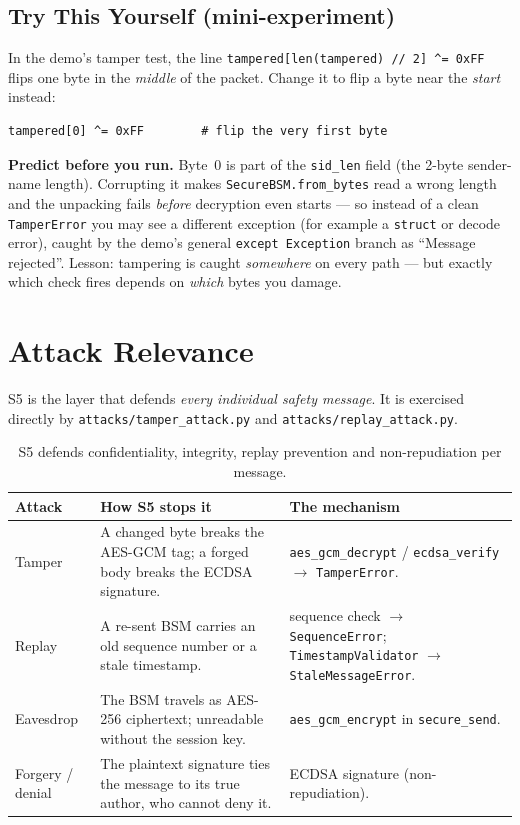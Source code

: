 \documentclass[11pt,a4paper]{article}
\begin{document}
\subsection{Try This Yourself (mini-experiment)}
In the demo's tamper test, the line \texttt{tampered[len(tampered) // 2] \^{}= 0xFF}
flips one byte in the \emph{middle} of the packet. Change it to flip a byte near
the \emph{start} instead:
\begin{lstlisting}[style=term]
tampered[0] ^= 0xFF        # flip the very first byte
\end{lstlisting}
\textbf{Predict before you run.} Byte~0 is part of the \texttt{sid\_len} field
(the 2-byte sender-name length). Corrupting it makes \texttt{SecureBSM.from\_bytes}
read a wrong length and the unpacking fails \emph{before} decryption even starts
--- so instead of a clean \texttt{TamperError} you may see a different exception
(for example a \texttt{struct} or decode error), caught by the demo's general
\texttt{except Exception} branch as ``Message rejected''. Lesson: tampering is
caught \emph{somewhere} on every path --- but exactly which check fires depends
on \emph{which} bytes you damage.

\section{Attack Relevance}

S5 is the layer that defends \emph{every individual safety message}. It is
exercised directly by \texttt{attacks/tamper\_attack.py} and
\texttt{attacks/replay\_attack.py}.

\begin{table}[h]
\centering
\small
\begin{tabular}{@{}p{2.5cm} p{6.1cm} p{4.9cm}@{}}
\toprule
\textbf{Attack} & \textbf{How S5 stops it} & \textbf{The mechanism}\\
\midrule
Tamper & A changed byte breaks the AES-GCM tag; a forged body breaks the ECDSA
signature. & \texttt{aes\_gcm\_decrypt} / \texttt{ecdsa\_verify} $\to$
\texttt{TamperError}.\\
Replay & A re-sent BSM carries an old sequence number or a stale timestamp. &
sequence check $\to$ \texttt{SequenceError}; \texttt{TimestampValidator} $\to$
\texttt{StaleMessageError}.\\
Eavesdrop & The BSM travels as AES-256 ciphertext; unreadable without the
session key. & \texttt{aes\_gcm\_encrypt} in \texttt{secure\_send}.\\
Forgery / denial & The plaintext signature ties the message to its true author,
who cannot deny it. & ECDSA signature (non-repudiation).\\
\bottomrule
\end{tabular}
\caption{S5 defends confidentiality, integrity, replay prevention and non-repudiation per message.}
\end{table}
\end{document}
